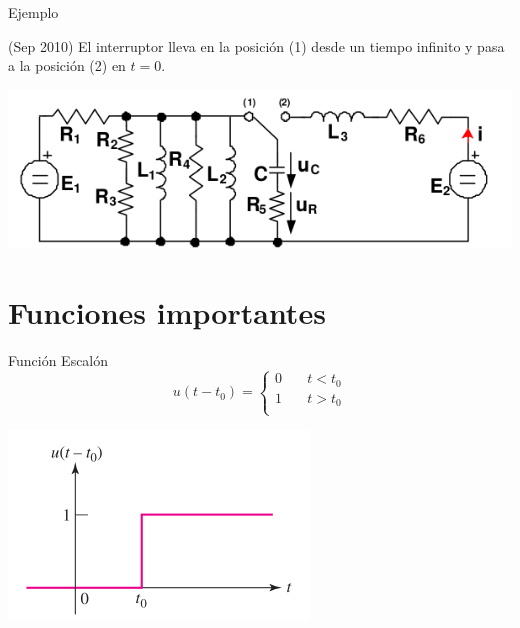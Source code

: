 \documentclass[aspectratio=169, usenames,svgnames,dvipsnames]{beamer}
\begin{document}
\begin{frame}[label={sec:org3c1442b}]{Ejemplo}
\begin{block}{(Sep 2010) El interruptor lleva en la posición (1) desde un tiempo infinito y pasa a la posición (2) en \(t = 0\).}
\begin{center}
\includegraphics[width=.9\linewidth]{../figs/ejemplo_condiciones_iniciales.pdf}
\end{center}
\end{block}
\end{frame}

\section{Funciones importantes}
\label{sec:org3d429cb}
\begin{frame}[label={sec:org6bb6fc0}]{Función Escalón}
\[   
u(t - t_0) = 
     \begin{cases}
       0 &\quad t < t_0\\
       1 &\quad t > t_0\\
     \end{cases}
\]
\begin{center}
\includegraphics[height=0.5\textheight]{../figs/funcion_escalon.pdf}
\end{center}
\end{frame}
\end{document}
